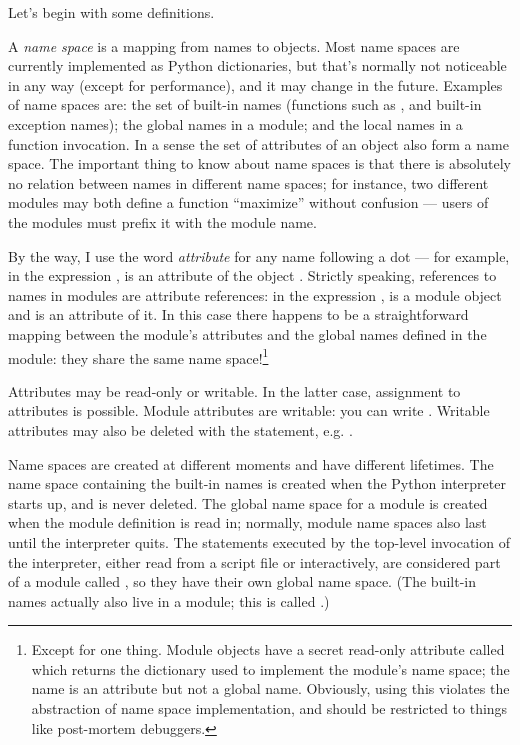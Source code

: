 \documentclass{manual}
\begin{document}
Let's begin with some definitions.

A \emph{name space} is a mapping from names to objects.  Most name
spaces are currently implemented as Python dictionaries, but that's
normally not noticeable in any way (except for performance), and it
may change in the future.  Examples of name spaces are: the set of
built-in names (functions such as , and built-in exception
names); the global names in a module; and the local names in a
function invocation.  In a sense the set of attributes of an object
also form a name space.  The important thing to know about name
spaces is that there is absolutely no relation between names in
different name spaces; for instance, two different modules may both
define a function ``maximize'' without confusion --- users of the
modules must prefix it with the module name.

By the way, I use the word \emph{attribute} for any name following a
dot --- for example, in the expression ,  is
an attribute of the object .  Strictly speaking, references to
names in modules are attribute references: in the expression
,  is a module object and
 is an attribute of it.  In this case there happens to
be a straightforward mapping between the module's attributes and the
global names defined in the module: they share the same name
space!\footnote{
        Except for one thing.  Module objects have a secret read-only
        attribute called  which returns the dictionary
        used to implement the module's name space; the name
         is an attribute but not a global name.
        Obviously, using this violates the abstraction of name space
        implementation, and should be restricted to things like
        post-mortem debuggers.
}

Attributes may be read-only or writable.  In the latter case,
assignment to attributes is possible.  Module attributes are writable:
you can write .  Writable attributes may
also be deleted with the  statement, e.g.
.

Name spaces are created at different moments and have different
lifetimes.  The name space containing the built-in names is created
when the Python interpreter starts up, and is never deleted.  The
global name space for a module is created when the module definition
is read in; normally, module name spaces also last until the
interpreter quits.  The statements executed by the top-level
invocation of the interpreter, either read from a script file or
interactively, are considered part of a module called
, so they have their own global name space.  (The
built-in names actually also live in a module; this is called
.)
\end{document}
